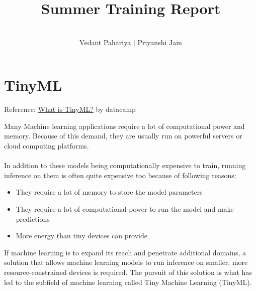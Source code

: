 \documentclass[12pt, a4paper]{article}
\title{Summer Training Report}
\author{\\[-5ex] Vedant Pahariya | Priyanshi Jain}
\date{}
\begin{document}
\maketitle
\tableofcontents
\newpage


\section{TinyML}
Reference: \href{https://www.datacamp.com/blog/what-is-tinyml-tiny-machine-learning}{What is TinyML?}  by datacamp

Many Machine learning applications require a lot of computational power and memory. Because of this demand, they are usually run on powerful servers or cloud computing platforms. 
\vspace{1em} \\
 \\

In addition to these models being computationally expensive to train, running inference on them is often quite expensive too because of following reasons:

\begin{itemize}[nosep]
    \item They require a lot of memory to store the model parameters
    \item They require a lot of computational power to run the model and make predictions
    \item More energy than tiny devices can provide
\end{itemize}

\vspace{1em}
If machine learning is to expand its reach and penetrate additional domains, a solution that allows machine learning models to run inference on smaller, more resource-constrained devices is required. The pursuit of this solution is what has led to the subfield of machine learning called Tiny Machine Learning (TinyML). 
\end{document}
